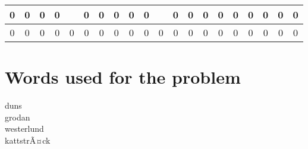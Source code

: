 \documentclass[a4paper]{article}
\begin{document}
{\begin{tabular}{|c|c|c|c|c|c|c|c|c|c|c|c|c|c|c|c|c|c|c|c|}
\cellcolor{black}0 & \cellcolor{black}0 & \cellcolor{black}0 & \cellcolor{black}0 &  & \cellcolor{black}0 & \cellcolor{black}0 & \cellcolor{black}0 & \cellcolor{black}0 & \cellcolor{black}0 &  & \cellcolor{black}0 & \cellcolor{black}0 & \cellcolor{black}0 & \cellcolor{black}0 & \cellcolor{black}0 & \cellcolor{black}0 & \cellcolor{black}0 & \cellcolor{black}0 & \cellcolor{black}0\\ \hline
\cellcolor{black}0 & \cellcolor{black}0 & \cellcolor{black}0 & \cellcolor{black}0 & \cellcolor{black}0 & \cellcolor{black}0 & \cellcolor{black}0 & \cellcolor{black}0 & \cellcolor{black}0 & \cellcolor{black}0 & \cellcolor{black}0 & \cellcolor{black}0 & \cellcolor{black}0 & \cellcolor{black}0 & \cellcolor{black}0 & \cellcolor{black}0 & \cellcolor{black}0 & \cellcolor{black}0 & \cellcolor{black}0 & \cellcolor{black}0\\ \hline
\end{tabular}
}

\section*{Words used for the problem}
\begin{multicols}{4}
\noindent
duns\\
grodan\\
westerlund\\
kattstrÃ¤ck\\
\end{multicols}
\newpage
\end{document}
